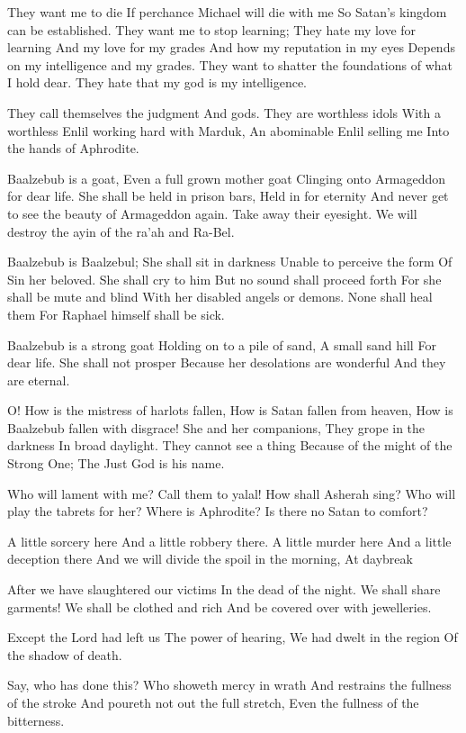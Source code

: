 \documentclass[
]{book}
\begin{document}
They want me to die
If perchance Michael will die with me
So Satan's kingdom can be established.
They want me to stop learning;
They hate my love for learning
And my love for my grades
And how my reputation in my eyes
Depends on my intelligence and my grades.
They want to shatter the foundations of what I hold dear.
They hate that my god is my intelligence.

They call themselves the judgment
And gods.
They are worthless idols
With a worthless Enlil working hard with Marduk,
An abominable Enlil selling me
Into the hands of Aphrodite.

Baalzebub is a goat,
Even a full grown mother goat
Clinging onto Armageddon for dear life.
She shall be held in prison bars,
Held in for eternity
And never get to see the beauty of Armageddon again.
Take away their eyesight.
We will destroy the ayin of the ra'ah and Ra-Bel.

Baalzebub is Baalzebul;
She shall sit in darkness
Unable to perceive the form
Of Sin her beloved.
She shall cry to him
But no sound shall proceed forth
For she shall be mute and blind
With her disabled angels or demons.
None shall heal them
For Raphael himself shall be sick.

Baalzebub is a strong goat
Holding on to a pile of sand,
A small sand hill
For dear life.
She shall not prosper
Because her desolations are wonderful
And they are eternal.

O! How is the mistress of harlots fallen,
How is Satan fallen from heaven,
How is Baalzebub fallen with disgrace!
She and her companions,
They grope in the darkness
In broad daylight.
They cannot see a thing
Because of the might of the Strong One;
The Just God is his name.

Who will lament with me?
Call them to yalal!
How shall Asherah sing?
Who will play the tabrets for her?
Where is Aphrodite?
Is there no Satan to comfort?

A little sorcery here
And a little robbery there.
A little murder here
And a little deception there
And we will divide the spoil in the morning,
At daybreak

After we have slaughtered our victims
In the dead of the night.
We shall share garments!
We shall be clothed and rich
And be covered over with jewelleries.

Except the Lord had left us
The power of hearing,
We had dwelt in the region
Of the shadow of death.

Say, who has done this?
Who showeth mercy in wrath
And restrains the fullness of the stroke
And poureth not out the full stretch,
Even the fullness of the bitterness.
\end{document}
